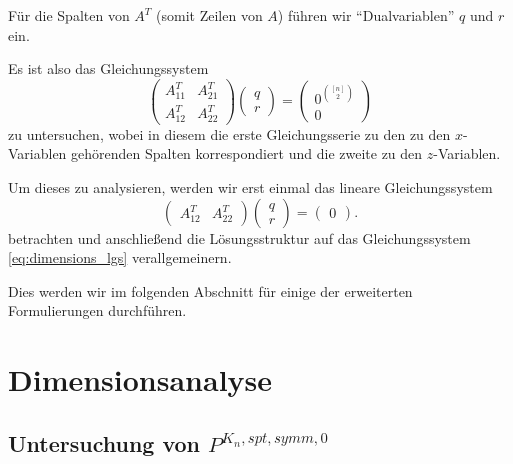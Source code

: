 \documentclass[10p,a4paper,BCOR = 12mm, DIV=15]{scrbook}
\begin{document}
Für die Spalten von $A^T$ (somit Zeilen von $A$) führen wir "`Dualvariablen"' $q$ und $r$ ein.

Es ist also das Gleichungssystem
\begin{equation}
\left(
\begin{array}{cc}
A_{11}^T & A_{21}^T \\
A_{12}^T & A_{22}^T
\end{array}
\right) \left(
\begin{array}{c}
q \\
r
\end{array}
\right) = 
\left(
\begin{array}{c}
0^{\left[n\right] \choose 2} \\
0
\end{array}
\right) \label{eq:dimensions_lgs}
\end{equation}
zu untersuchen, wobei in diesem die erste Gleichungsserie zu den zu den $x$-Variablen gehörenden Spalten korrespondiert und die zweite zu den $z$-Variablen.

Um dieses zu analysieren, werden wir erst einmal das lineare Gleichungssystem
\begin{displaymath}
\left(
\begin{array}{cc}
A_{12}^T & A_{22}^T
\end{array}
\right) \left(
\begin{array}{c}
q \\
r
\end{array}
\right) = \left(
\begin{array}{c}
0
\end{array}
\right).
\end{displaymath}
betrachten und anschließend die Lösungsstruktur auf das Gleichungssystem \eqref{eq:dimensions_lgs} verallgemeinern.

Dies werden wir im folgenden Abschnitt für einige der erweiterten Formulierungen  durchführen.

\section{Dimensionsanalyse}

\subsection{Untersuchung von $P^{K_n, spt, symm, 0}$}
\end{document}
